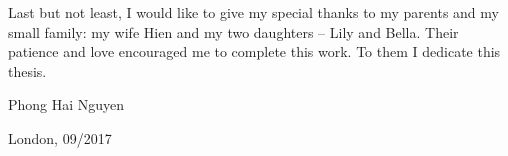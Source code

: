 Last but not least, I would like to give my special thanks to my parents and my small family: my wife Hien and my two daughters -- Lily and Bella. Their patience and love encouraged me to complete this work. To them I dedicate this thesis.

\vspace{1cm}
\begin{flushright}
Phong Hai Nguyen

London, 09/2017
\end{flushright}